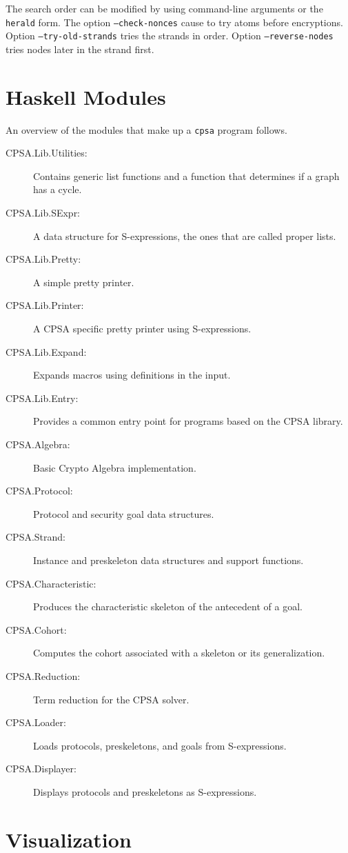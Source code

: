 \documentclass[12pt]{report}
\theoremstyle{definition}
\begin{document}
\enlargethispage{\baselineskip}
The search order can be modified by using command-line arguments or
the \texttt{herald} form.  The option \texttt{--check-nonces} cause
{\cpsa} to try atoms before encryptions.  Option
\texttt{--try-old-strands} tries the strands in order.  Option
\texttt{--reverse-nodes} tries nodes later in the strand first.

\chapter{Haskell Modules}\label{cha:haskell modules}

An overview of the modules that make up a \texttt{cpsa} program
follows.

\begin{description}
\item[CPSA.Lib.Utilities:]
Contains generic list functions and a function that determines if a
graph has a cycle.
\item[CPSA.Lib.SExpr:]
A data structure for S-expressions, the ones that are called
proper lists.
\item[CPSA.Lib.Pretty:]
A simple pretty printer.
\item[CPSA.Lib.Printer:]
A CPSA specific pretty printer using S-expressions.
\item[CPSA.Lib.Expand:]
Expands macros using definitions in the input.
\item[CPSA.Lib.Entry:]
Provides a common entry point for programs based on the CPSA library.
\item[CPSA.Algebra:]
Basic Crypto Algebra implementation.
\item[CPSA.Protocol:]
Protocol and security goal data structures.
\item[CPSA.Strand:]
Instance and preskeleton data structures and support functions.
\item[CPSA.Characteristic:]
Produces the characteristic skeleton of the antecedent of a goal.
\item[CPSA.Cohort:]
Computes the cohort associated with a skeleton or its generalization.
\item[CPSA.Reduction:]
Term reduction for the CPSA solver.
\item[CPSA.Loader:]
Loads protocols, preskeletons, and goals from S-expressions.
\item[CPSA.Displayer:]
Displays protocols and preskeletons as S-expressions.
\end{description}

\chapter{Visualization}\label{cha:viz}
\end{document}
